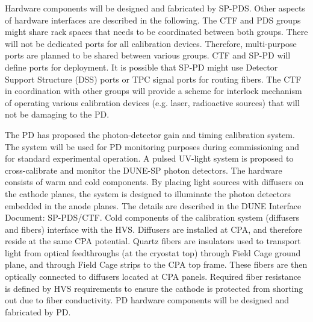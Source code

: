 Hardware components will be designed and fabricated by SP-PDS. Other aspects of hardware interfaces are described in the following. The CTF and PDS groups might share rack spaces that needs to be coordinated between both groups. There will not be dedicated ports for all calibration devices. Therefore, multi-purpose ports are planned to be shared between various groups. CTF and SP-PD will define ports for deployment. It is possible that SP-PD might use Detector Support Structure (DSS) ports or TPC signal ports for routing fibers. The CTF in coordination with other groups will provide a scheme for interlock mechanism of operating various calibration devices (e.g. laser, radioactive sources) that will not be damaging to the PD. 

The PD has proposed the photon-detector gain and timing calibration system. The system will be used for PD monitoring purposes during commissioning and for standard experimental operation. A pulsed UV-light system is proposed to cross-calibrate and monitor the DUNE-SP photon detectors. The hardware consists of warm and cold components. By placing light sources with diffusers on the cathode planes, the system is designed to illuminate the photon detectors embedded in the anode planes. The details are described in the DUNE Interface Document: SP-PDS/CTF. Cold components of the calibration system (diffusers and fibers) interface with the HVS. Diffusers are installed at CPA, and therefore reside at the same CPA potential. Quartz fibers are insulators used to transport light from optical feedthroughs (at the cryostat top) through Field Cage ground plane, and through Field Cage strips to the CPA top frame. These fibers are then optically connected to diffusers located at CPA panels. Required fiber resistance is defined by HVS requirements to ensure the cathode is protected from shorting out due to fiber conductivity. PD hardware components will be designed and fabricated by PD.







